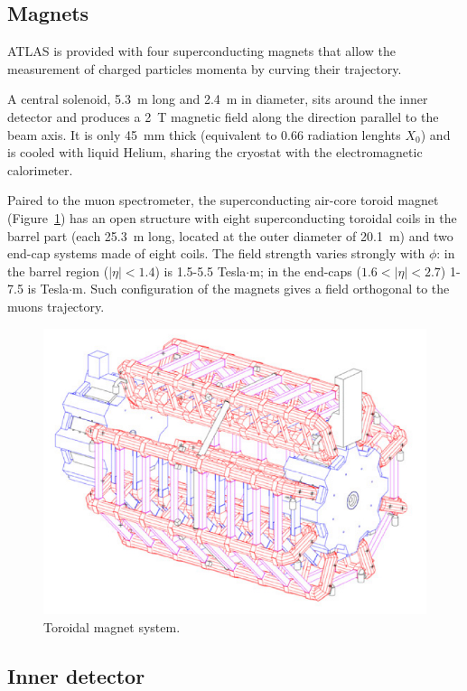 \subsection{Magnets}\label{sec:magnets}

ATLAS is provided with four superconducting magnets that allow the measurement of
charged particles momenta by curving their trajectory. 

A central solenoid, 5.3~m long and 2.4~m in diameter, sits 
around the inner detector and produces a 2~T magnetic field along the direction
parallel to the beam axis. It is only 45~mm thick (equivalent to 0.66 radiation lenghts $X_0$)
and is cooled with liquid Helium, sharing the cryostat with the electromagnetic calorimeter.

Paired to the muon spectrometer, the superconducting air-core toroid magnet (Figure~\ref{magnets}) 
has an open structure with eight superconducting toroidal coils in the barrel part (each 25.3~m long, located
at the outer diameter of 20.1~m) and
two end-cap systems made of eight coils. The field strength varies strongly with $\phi$:
in the barrel region ($|\eta|<1.4$) is 1.5-5.5 Tesla$\cdot$m; in the end-caps ($1.6<|\eta|<2.7$) 1-7.5 is Tesla$\cdot$m. 
Such configuration of the magnets gives a field orthogonal to the muons trajectory.

\begin{figure}[hbt]\begin{center}
\includegraphics[width=.8\textwidth]{detector/figures/magnets}\caption{Toroidal magnet system.}\label{magnets}
\end{center}\end{figure}



\subsection{Inner detector}\label{sec:innerdet}

